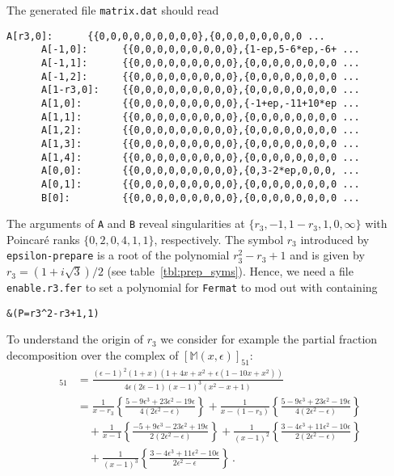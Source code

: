 \documentclass[12pt]{article}
\numberwithin{equation}{section}
\numberwithin{figure}{section}
\newcommand{\M}{\mathds{M}}
\begin{document}
    The generated file \texttt{matrix.dat} should read
    \begin{lstlisting}[basicstyle=\ttfamily,xleftmargin=-2em]
      A[r3,0]:  	{{0,0,0,0,0,0,0,0,0},{0,0,0,0,0,0,0,0 ...
      A[-1,0]:  	{{0,0,0,0,0,0,0,0,0},{1-ep,5-6*ep,-6+ ...
      A[-1,1]:  	{{0,0,0,0,0,0,0,0,0},{0,0,0,0,0,0,0,0 ...
      A[-1,2]:  	{{0,0,0,0,0,0,0,0,0},{0,0,0,0,0,0,0,0 ...
      A[1-r3,0]:	{{0,0,0,0,0,0,0,0,0},{0,0,0,0,0,0,0,0 ...
      A[1,0]:   	{{0,0,0,0,0,0,0,0,0},{-1+ep,-11+10*ep ...
      A[1,1]:   	{{0,0,0,0,0,0,0,0,0},{0,0,0,0,0,0,0,0 ...
      A[1,2]:   	{{0,0,0,0,0,0,0,0,0},{0,0,0,0,0,0,0,0 ...
      A[1,3]:   	{{0,0,0,0,0,0,0,0,0},{0,0,0,0,0,0,0,0 ...
      A[1,4]:   	{{0,0,0,0,0,0,0,0,0},{0,0,0,0,0,0,0,0 ...
      A[0,0]:   	{{0,0,0,0,0,0,0,0,0},{0,3-2*ep,0,0,0, ...
      A[0,1]:   	{{0,0,0,0,0,0,0,0,0},{0,0,0,0,0,0,0,0 ...
      B[0]:     	{{0,0,0,0,0,0,0,0,0},{0,0,0,0,0,0,0,0 ...
    \end{lstlisting}      
    The arguments of \texttt{A} and \texttt{B} reveal singularities at $\{r_3,-1,1-r_3,1,0,\infty\}$ with Poincar\'{e} ranks $\{0,2,0,4,1,1\}$, respectively.
    The symbol $r_3$ introduced by \texttt{epsilon-prepare} is a root of the polynomial $r_3^2 - r_3 + 1$ and is given by $r_3 = (1+i\sqrt3)/2$ (see table~\ref{tbl:prep_syms}).
    Hence, we need a file \texttt{enable.r3.fer} to set a polynomial for \texttt{Fermat} to mod out with containing
    \begin{lstlisting}[basicstyle=\ttfamily,xleftmargin=-2em]
      &(P=r3^2-r3+1,1)
    \end{lstlisting}      
    To understand the origin of $r_3$ we consider for example the partial fraction decomposition over the complex of $[\M(x,\epsilon)]_{51}$:
    \begin{align*}
      [\M(x,\epsilon)]_{51}
      &= 
      \frac{(\epsilon-1)^2(1+x)\left(1+4x+x^2+\epsilon\left(1-10x+x^2\right)\right)}{4\epsilon(2\epsilon-1)(x-1)^3\left(x^2-x+1\right)} \\
      &= 
        \frac1{x-r_3} \left\{
          \frac{5-9\epsilon^3+23\epsilon^2-19\epsilon}{4(2\epsilon^2-\epsilon)}
        \right\}
        +
        \frac1{x-(1-r_3)} \left\{
          \frac{5-9\epsilon^3+23\epsilon^2-19\epsilon}{4(2\epsilon^2-\epsilon)}
        \right\} \\ &\quad
        +
        \frac1{x-1} \left\{
          \frac{-5+9\epsilon^3-23\epsilon^2+19\epsilon}{2(2\epsilon^2-\epsilon)}
        \right\}
        +
        \frac1{(x-1)^2} \left\{
           \frac{3-4\epsilon^3+11\epsilon^2-10\epsilon}{2(2\epsilon^2-\epsilon)}
        \right\} \\ &\quad
        + 
        \frac1{(x-1)^3} \left\{
          \frac{3-4\epsilon^3+11\epsilon^2-10\epsilon}{2\epsilon^2-\epsilon}
        \right\}\,.
    \end{align*}
\end{document}

